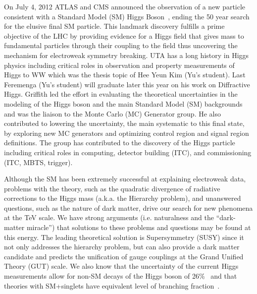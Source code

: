 On July 4, 2012 ATLAS and CMS announced the observation of a new particle consistent with a Standard Model (SM) Higgs Boson~\cite{ATLAS-Higgs-Observation, CMS-Higgs-Observation}, ending the 50 year search for the elusive final SM particle. This landmark discovery fulfills a prime objective of the LHC by providing evidence for a Higgs field that gives mass to fundamental particles through their coupling to the field thus uncovering the mechanism for  electroweak symmetry breaking.
UTA has a long history in Higgs physics including critical roles in observation and property measurements of Higgs to WW which was the thesis topic of Hee Yeun Kim (Yu's student).  Last Feremenga (Yu's student) will graduate later this year on his work on Diffractive Higgs.
Griffith led the effort in evaluating the theoretical uncertainties in the modeling of the Higgs boson and the main Standard Model (SM) backgrounds and was the liaison to the Monte Carlo (MC) Generator group. He also contributed to lowering the uncertainty, the main systematic to this final state, by exploring new MC generators and optimizing control region and signal region definitions.
The group has contributed to the discovery of the Higgs particle including critical roles in computing, detector building (ITC), and commissioning (ITC, MBTS, trigger).

Although the SM has been extremely successful at explaining electroweak data, problems with the theory, such as the quadratic divergence of radiative corrections to the Higgs mass (a.k.a. the Hierarchy problem), and unanswered questions, such as the nature of dark matter, drive our search for new phenomena at the TeV scale. We have strong arguments (i.e. naturalness and the ``dark-matter miracle'') 
that solutions to these problems and questions may be found at this energy. 
The leading theoretical solution is Supersymmetry (SUSY) since it not only addresses the hierarchy problem, but can also provide a dark matter candidate and predicts the unification of gauge couplings at the Grand Unified Theory (GUT) scale.
We also know that the uncertainty of the current Higgs measurements allow for non-SM decays of the Higgs boson of 26\%~\cite{combin} and that theories with SM+singlets have equivalent level of branching fraction~\cite{exohiggs}.

